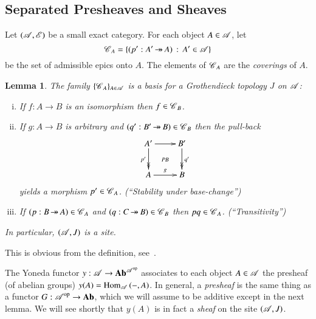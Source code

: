 \documentclass[1p]{elsarticle}
\makeatletter
\renewenvironment{proof}[1][\proofname]{\par
  \pushQED{\qed}%
  \normalfont \topsep6\p@\@plus6\p@\relax
  \trivlist
  \item[\hskip\labelsep
        \scshape
    #1\@addpunct{.}]\ignorespaces
}{%
  \popQED\endtrivlist\@endpefalse
}
\theoremstyle{mythm}
\newtheorem{Lem}[Thm]{Lemma}
\theoremstyle{mydef}
\makeatother
\begin{document}
\subsection{Separated Presheaves and Sheaves}


Let $(\operatorname{\mathscr{A}},\operatorname{\mathscr{E}})$ be a small exact category. For each object
$A \in \operatorname{\mathscr{A}}$, let
\[
\operatorname{\mathscr{C}}_{A} = \{(p': A' \operatorname{\twoheadrightarrow} A)\,: \,A' \in \operatorname{\mathscr{A}}\}
\]
be the set of admissible epics onto $A$. The elements of $\operatorname{\mathscr{C}}_{A}$
are the \emph{coverings} of $A$.

\begin{Lem}
  \label{lem:basis-topology}
  The family $\{\operatorname{\mathscr{C}}_{A}\}_{A \in \operatorname{\mathscr{A}}}$ is a
  \emph{basis for a Grothendieck topology} $J$ on
  $\operatorname{\mathscr{A}}$:
  \begin{enumerate}[(i)]
    \item
      If $f: A \to B$ is an isomorphism then $f \in \operatorname{\mathscr{C}}_{B}$.
      
    \item
      If $g: A \to B$ is arbitrary and $(q': B' \operatorname{\twoheadrightarrow} B) \in \operatorname{\mathscr{C}}_{B}$
      then the pull-back
      \[
      \xymatrix{
        A' \ar[r] \ar@{->>}[d]_{p'} \ar@{}[dr]|{\text{\emph{PB}}} &
        B' \ar@{->>}[d]^{q'} \\
        A \ar[r]^{g} & B
      }
      \]
      yields a morphism $p' \in \operatorname{\mathscr{C}}_{A}$. \emph{(``Stability under
        base-change'')} 

    \item
      If $(p: B \operatorname{\twoheadrightarrow} A) \in \operatorname{\mathscr{C}}_{A}$ and $(q: C \operatorname{\twoheadrightarrow} B) \in \operatorname{\mathscr{C}}_{B}$
      then $pq \in \operatorname{\mathscr{C}}_{A}$. \emph{(``Transitivity'')}
  \end{enumerate}
  In particular, $(\operatorname{\mathscr{A}},J)$ is a \emph{site}.
\end{Lem}
\begin{proof}
  This is obvious from the definition, 
  see~\cite[Definition~2, p.~111]{MR1300636}.
\end{proof}

The Yoneda functor $y: \operatorname{\mathscr{A}} \to \operatorname{\mathbf{Ab}}^{\operatorname{\mathscr{A}}^{\operatorname{op}}}$ associates to
each object $A \in \operatorname{\mathscr{A}}$ the presheaf (of abelian groups)
$y(A) = \operatorname{Hom}_{\operatorname{\mathscr{A}}}{({-},A)}$. In general, a \emph{presheaf} is the
same thing as a functor
$G: \operatorname{\mathscr{A}}^{\operatorname{op}} \to \operatorname{\mathbf{Ab}}$, which we will assume to
be additive except in the next lemma. We will see shortly that $y(A)$ is in
fact a \emph{sheaf} on the site $(\operatorname{\mathscr{A}},J)$.
\end{document}
